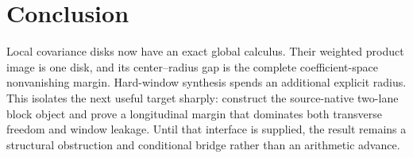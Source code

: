 \section{Conclusion}

Local covariance disks now have an exact global calculus.  Their weighted
product image is one disk, and its center--radius gap is the complete
coefficient-space nonvanishing margin.  Hard-window synthesis spends an
additional explicit radius.  This isolates the next useful target sharply:
construct the source-native two-lane block object and prove a longitudinal
margin that dominates both transverse freedom and window leakage.  Until that
interface is supplied, the result remains a structural obstruction and
conditional bridge rather than an arithmetic advance.
